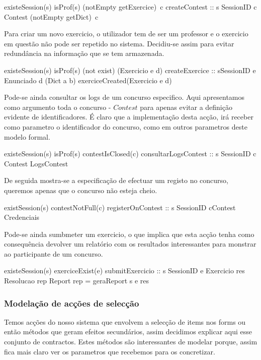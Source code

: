 \prop
{ existeSession(s)  \wedge isProf(s) \wedge (notEmpty \circ getExercice)~c}
{createContest :: s \unif SessionID \rarrow c \unif Contest }
{ (notEmpty \circ getDict)~c }

Para criar um novo exercicio, o utilizador tem de ser um professor e o exercicio em questão não pode ser repetido no sistema. Decidiu-se assim para evitar redundância
na informação que se tem armazenada.

\prop
{ existeSession(s)  \wedge isProf(s) \wedge (not \circ exist) (Exercicio e d)}
{createExercice :: s\unif SessionID \rarrow e \unif Enunciado \rarrow d \unif (Dict a b) }
{ exerciceCreated(Exercicio e d) }

Pode-se ainda consultar os logs de um concurso especifico. Aqui apresentamos como argumento toda o concurso - $Contest$ para apenas evitar a definição evidente
de identificadores. É claro que a implementação desta acção, irá receber como parametro o identificador do concurso, como em outros parametros deste modelo formal.

\prop 
{ existeSession(s) \wedge isProf(s) \wedge contestIsClosed(c) }
{consultarLogsContest :: s \unif SessionID \rarrow c \unif Contest \rarrow LogsContest}
{}

De seguida mostra-se a especificação de efectuar um registo no concurso, queremos apenas que o concurso não esteja cheio.

\prop
{ existSession(s) \wedge contestNotFull(c)}
{registerOnContest :: s \unif SessionID \rarrow c\unif Contest \rarrow Credenciais}
{ }

Pode-se ainda sumbmeter um exercicio, o que implica que esta acção tenha como consequência devolver um relatório com os resultados interessantes para monstrar
ao participante de um concurso.

\prop
{ existeSession(s) \wedge exerciceExist(e) }
{ submitExercicio :: s \unif SessionID \rarrow e \unif Exercicio \rarrow res \unif Resolucao \rarrow rep \unif Report}
{ rep = geraReport s e res }

\subsubsection{Modelação de acções de selecção}
Temos acções do nosso sistema que envolvem a selecção de items nos forms ou então métodos que geram efeitos secundários, assim decidimos explicar aqui esse conjunto de
contractos. Estes métodos são interessantes de modelar porque, assim fica mais claro ver os parametros que recebemos para os concretizar.\\

